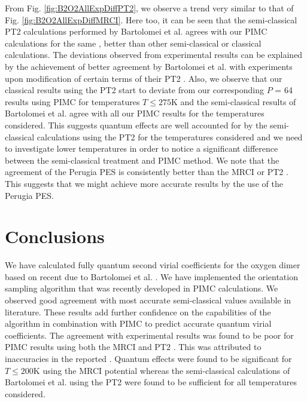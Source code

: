     From Fig. \ref{fig:B2O2AllExpDiffPT2}, we observe a trend very similar to that of Fig. \ref{fig:B2O2AllExpDiffMRCI}. Here too, it can be seen that the semi-classical PT2 calculations performed by Bartolomei et al. \cite{Bartolomei2010} agrees with our PIMC calculations for the same \PESs{}, better than other semi-classical or classical calculations. The deviations observed from experimental results can be explained by the achievement of better agreement by Bartolomei et al. \cite{Bartolomei2010} with experiments upon modification of certain terms of their PT2 \PESs{}. Also, we observe that our classical results using the PT2 \PESs{} start to deviate from our corresponding $P$ = 64 results using PIMC for temperatures $T \le 275$K and the semi-classical results of Bartolomei et al. \cite{Bartolomei2010} agree with all our PIMC results for the temperatures considered. This suggests quantum effects are well accounted for by the semi-classical calculations using the PT2 \PESs{} for the temperatures considered and we need to investigate lower temperatures in order to notice a significant difference between the semi-classical treatment and PIMC method. We note that the agreement of the Perugia PES is consistently better than the MRCI or PT2 \PESs{}. This suggests that we might achieve more accurate results by the use of the Perugia \cite{Aquilanti1999} PES.

    \section{Conclusions}
        We have calculated fully quantum second virial coefficients for the oxygen dimer based on recent \abinitio{} \PESs{} due to Bartolomei et al. \cite{Bartolomei2010}. We have implemented the orientation sampling algorithm that was recently developed \cite{hydrogen} in PIMC calculations. We observed good agreement with most accurate semi-classical values available in literature. These results add further confidence on the capabilities of the algorithm in combination with PIMC to predict accurate quantum virial coefficients. The agreement with experimental results was found to be poor for PIMC results using both the MRCI and PT2 \PESs{}. This was attributed to inaccuracies in the reported \PESs{}. Quantum effects were found to be significant for $T \le 200$K using the MRCI potential whereas the semi-classical calculations of Bartolomei et al. \cite{Bartolomei2010} using the PT2 \PESs{} were found to be sufficient for all temperatures considered.

